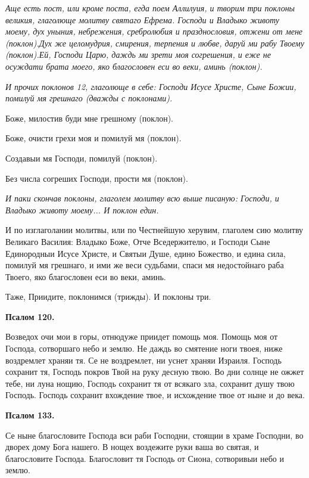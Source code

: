 \itshape Аще есть пост, или кроме поста, егда поем Аллилуия, и творим три поклоны великия, глаголюще молитву святаго Ефрема\normalfont{}. Господи и Владыко животу моему, дух уныния, небрежения, сребролюбия и празднословия, отжени от мене (поклон).Дух же целомудрия, смирения, терпения и любве, даруй ми рабу Твоему (поклон).Ей, Господи Царю, даждь ми зрети моя согрешения, и еже не осуждати брата моего, яко благословен еси во веки, аминь (поклон).

\itshape И прочих поклонов 12, глаголюще в себе:\normalfont{} Господи Исусе Христе, Сыне Божии, помилуй мя грешнаго (дважды с поклонами).

Боже, милостив буди мне грешному (поклон).

Боже, очисти грехи моя и помилуй мя (поклон).

Создавыи мя Господи, помилуй (поклон).

Без числа согреших Господи, прости мя (поклон).

\itshape И паки скончав поклоны, глаголем молитву всю выше писаную:\normalfont{} Господи, и Владыко животу моему... И поклон един. 


И по изглаголании молитвы, или по Честнейшую херувим, глаголем сию молитву Великаго Василия: Владыко Боже, Отче Вседержителю, и Господи Сыне Единородныи Исусе Христе, и Святыи Душе, едино Божество, и едина сила, помилуй мя грешнаго, и ими же веси судьбами, спаси мя недостойнаго раба Твоего, яко благословен еси во веки, аминь. 


Таже, Приидите, поклонимся (трижды). И поклоны три. 


\medskip


\bfseries Псалом 120.\normalfont{}\nopagebreak


Возведох очи мои в горы, отнюдуже приидет помощь моя. Помощь моя от Господа, сотворшаго небо и землю. Не даждь во смятение ноги твоея, ниже воздремлет храняи тя. Се не воздремлет, ни уснет храняи Израиля. Господь сохранит тя, Господь покров Твой на руку десную твою. Во дни солнце не ожжет тебе, ни луна нощию, Господь сохранит тя от всякаго зла, сохранит душу твою Господь. Господь сохранит вхождение твое, и исхождение твое от ныне и до века.


\medskip


\bfseries Псалом 133.\normalfont{}\nopagebreak


Се ныне благословите Господа вси раби Господни, стоящии в храме Господни, во дворех дому Бога нашего. В нощех воздежите руки ваша во святая, и благословите Господа. Благословит тя Господь от Сиона, сотворивыи небо и землю. 


